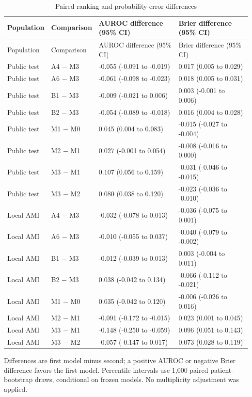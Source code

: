 \documentclass[pdflatex,sn-vancouver-num]{sn-jnl}
\begin{document}
\begingroup\scriptsize\setlength{\tabcolsep}{2pt}
\begin{longtable}{llll}
\caption{Paired ranking and probability-error differences}\label{tab:s5}\\
\toprule
Population & Comparison & AUROC difference (95\% CI) & Brier difference (95\% CI)\\\midrule
\endfirsthead
\toprule
Population & Comparison & AUROC difference (95\% CI) & Brier difference (95\% CI)\\\midrule
\endhead
\endfoot
\bottomrule\endlastfoot
Public test & A4 $-$ M3 & -0.055 (-0.091 to -0.019) & 0.017 (0.005 to 0.029)\\
Public test & A6 $-$ M3 & -0.061 (-0.098 to -0.023) & 0.018 (0.005 to 0.031)\\
Public test & B1 $-$ M3 & -0.009 (-0.021 to 0.006) & 0.003 (-0.001 to 0.006)\\
Public test & B2 $-$ M3 & -0.054 (-0.089 to -0.018) & 0.016 (0.004 to 0.028)\\
Public test & M1 $-$ M0 & 0.045 (0.004 to 0.083) & -0.015 (-0.027 to -0.004)\\
Public test & M2 $-$ M1 & 0.027 (-0.001 to 0.054) & -0.008 (-0.016 to 0.000)\\
Public test & M3 $-$ M1 & 0.107 (0.056 to 0.159) & -0.031 (-0.046 to -0.015)\\
Public test & M3 $-$ M2 & 0.080 (0.038 to 0.120) & -0.023 (-0.036 to -0.010)\\
Local AMI & A4 $-$ M3 & -0.032 (-0.078 to 0.013) & -0.036 (-0.075 to 0.001)\\
Local AMI & A6 $-$ M3 & -0.010 (-0.055 to 0.037) & -0.040 (-0.079 to -0.002)\\
Local AMI & B1 $-$ M3 & -0.012 (-0.039 to 0.013) & 0.003 (-0.004 to 0.011)\\
Local AMI & B2 $-$ M3 & 0.038 (-0.042 to 0.134) & -0.066 (-0.112 to -0.021)\\
Local AMI & M1 $-$ M0 & 0.035 (-0.042 to 0.120) & -0.006 (-0.026 to 0.016)\\
Local AMI & M2 $-$ M1 & -0.091 (-0.172 to -0.015) & 0.023 (0.001 to 0.045)\\
Local AMI & M3 $-$ M1 & -0.148 (-0.250 to -0.059) & 0.096 (0.051 to 0.143)\\
Local AMI & M3 $-$ M2 & -0.057 (-0.147 to 0.017) & 0.073 (0.028 to 0.119)\\
\end{longtable}
\noindent Differences are first model minus second; a positive AUROC or negative Brier difference favors the first model. Percentile intervals use 1,000 paired patient-bootstrap draws, conditional on frozen models. No multiplicity adjustment was applied.\par\endgroup
\end{document}
